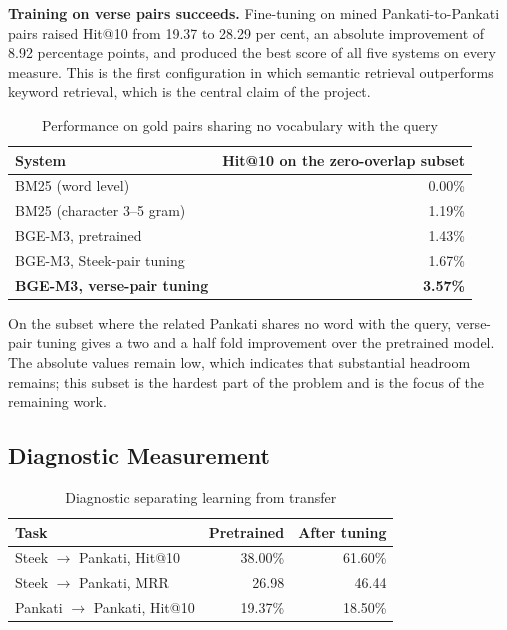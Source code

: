 \documentclass[12pt,a4paper]{article}
\begin{document}
\vspace{0.2cm}

\noindent\textbf{Training on verse pairs succeeds.}
Fine-tuning on mined Pankati-to-Pankati pairs raised Hit@10 from 19.37 to 28.29 per cent, an absolute improvement of 8.92 percentage points, and produced the best score of all five systems on every measure. This is the first configuration in which semantic retrieval outperforms keyword retrieval, which is the central claim of the project.

\begin{table}[H]
\centering
\renewcommand{\arraystretch}{1.3}
\caption{Performance on gold pairs sharing no vocabulary with the query}
\begin{tabular}{|p{6.8cm}|r|}
\hline
\textbf{System} & \textbf{Hit@10 on the zero-overlap subset} \\
\hline
BM25 (word level) & 0.00\% \\
\hline
BM25 (character 3--5 gram) & 1.19\% \\
\hline
BGE-M3, pretrained & 1.43\% \\
\hline
BGE-M3, Steek-pair tuning & 1.67\% \\
\hline
\textbf{BGE-M3, verse-pair tuning} & \textbf{3.57\%} \\
\hline
\end{tabular}
\end{table}

\vspace{0.3cm}

On the subset where the related Pankati shares no word with the query, verse-pair tuning gives a two and a half fold improvement over the pretrained model. The absolute values remain low, which indicates that substantial headroom remains; this subset is the hardest part of the problem and is the focus of the remaining work.

\subsection{Diagnostic Measurement}

\begin{table}[H]
\centering
\renewcommand{\arraystretch}{1.3}
\caption{Diagnostic separating learning from transfer}
\begin{tabular}{|p{5.6cm}|r|r|}
\hline
\textbf{Task} & \textbf{Pretrained} & \textbf{After tuning} \\
\hline
Steek $\rightarrow$ Pankati, Hit@10 & 38.00\% & 61.60\% \\
\hline
Steek $\rightarrow$ Pankati, MRR & 26.98 & 46.44 \\
\hline
Pankati $\rightarrow$ Pankati, Hit@10 & 19.37\% & 18.50\% \\
\hline
\end{tabular}
\end{table}
\end{document}
